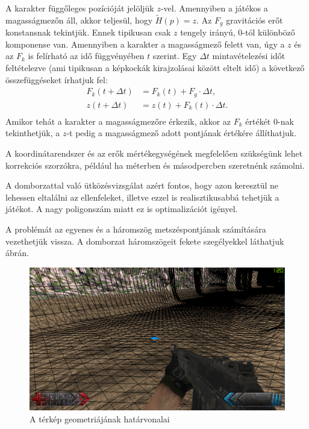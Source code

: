 A karakter függőleges pozícióját jelöljük $z$-vel. Amennyiben a játékos a magasságmezőn áll, akkor teljesül, hogy $\widetilde{H}(p) = z$. Az $F_g$ gravitációs erőt konstansnak tekintjük. Ennek tipikusan csak $z$ tengely irányú, $0$-tól különböző komponense van. Amennyiben a karakter a magasságmező felett van, úgy a $z$ és az $F_k$ is felírható az idő függvényében $t$ szerint. Egy $\Delta t$ mintavételezési időt feltételezve (ami tipikusan a képkockák kirajzolásai között eltelt idő) a következő összefüggéseket írhatjuk fel:
\begin{align*}
F_k(t + \Delta t) &= F_k(t) + F_g \cdot \Delta t, \\
z(t + \Delta t) &= z(t) + F_k(t) \cdot \Delta t. \\
\end{align*}
Amikor tehát a karakter a magasságmezőre érkezik, akkor az $F_k$ értékét $0$-nak tekinthetjük, a $z$-t pedig a magasságmező adott pontjának értékére állíthatjuk.

A koordinátarendszer és az erők mértékegységének megfelelően szükségünk lehet korrekciós szorzókra, például ha méterben és másodpercben szeretnénk számolni.
 

A domborzattal való ütközésvizsgálat azért fontos, hogy azon keresztül ne lehessen eltalálni az ellenfeleket, illetve ezzel is realisztikusabbá tehetjük a játékot. A nagy poligonszám miatt ez is optimalizációt igényel.

A problémát az egyenes és a háromszög metszéspontjának számítására vezethetjük vissza. A domborzat háromszögeit fekete szegélyekkel láthatjuk  ábrán.

\begin{figure}[h]
\centering
\includegraphics[scale=0.44]{kepek/map_wireframe.png}
\caption{A térkép geometriájának határvonalai}
\label{fig:wireframe}
\end{figure}

